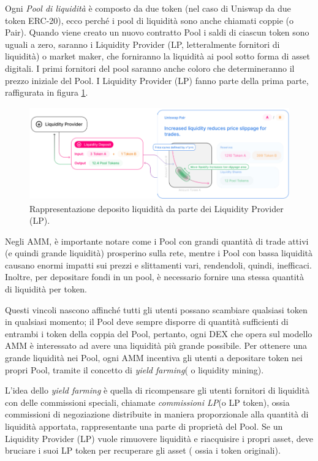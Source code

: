 Ogni \textit{Pool di liquidità} è composto da due token (nel caso di Uniswap da due token ERC-20), ecco perché i pool di liquidità sono anche chiamati coppie (o Pair).
Quando viene creato un nuovo contratto Pool i saldi di ciascun token sono uguali a zero, saranno i Liquidity Provider (LP, letteralmente fornitori di liquidità) o market maker, che forniranno la liquidità ai pool sotto forma di asset digitali. I primi fornitori del pool saranno anche coloro che determineranno il prezzo iniziale del Pool. I Liquidity Provider (LP) fanno parte della prima parte, raffigurata in figura \ref{liquidity}.
\begin{figure}[h]
    \centering
    \includegraphics[width=12cm,height=4cm]{Immagini/liquidity.png}
    \caption[Rappresentazione grafica del funzionamento per il deposito liquidità da parte dei Liquidity Provider (LP)]{Rappresentazione deposito liquidità da parte dei Liquidity Provider (LP).}
    \label{liquidity}
\end{figure}

Negli AMM, è importante notare come i Pool con grandi quantità di trade attivi (e quindi grande liquidità) prosperino sulla rete, mentre i Pool con bassa liquidità causano enormi impatti sui prezzi e slittamenti vari, rendendoli, quindi, inefficaci. Inoltre, per depositare fondi in un pool, è necessario fornire una stessa quantità di liquidità per token.

Questi vincoli nascono affinché tutti gli utenti possano scambiare qualsiasi token in qualsiasi momento; il Pool deve sempre disporre di quantità sufficienti di entrambi i token della coppia del Pool, pertanto, ogni DEX che opera sul modello AMM è interessato ad avere una liquidità più grande possibile. Per ottenere una grande liquidità nei Pool, ogni AMM incentiva gli utenti a depositare token nei propri Pool, tramite il concetto di \textit{yield farming}( o liquidity mining).

L'idea dello \textit{yield farming} è quella di ricompensare gli utenti fornitori di liquidità con delle commissioni speciali, chiamate \textit{commissioni LP}(o LP token), ossia commissioni di negoziazione distribuite in maniera proporzionale alla quantità di liquidità apportata, rappresentante una parte di proprietà del Pool. Se un Liquidity Provider (LP) vuole rimuovere liquidità e riacquisire i propri asset, deve bruciare i suoi LP token per recuperare gli asset ( ossia i token originali).

